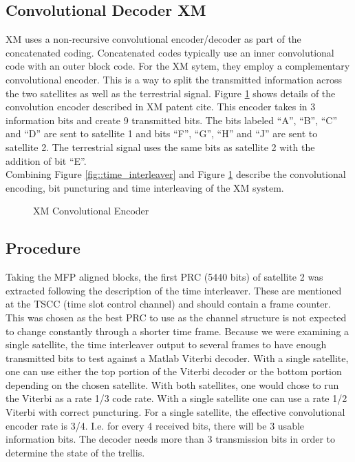 \documentclass[conference,onecolumn]{IEEEtran}
\begin{document}
\subsection{Convolutional Decoder XM}
XM uses a non-recursive convolutional encoder/decoder as part of the concatenated coding.  Concatenated codes typically use an inner convolutional code with an outer block code.  For the XM sytem, they employ a complementary convolutional encoder.  This is a way to split the transmitted information across the two satellites as well as the terrestrial signal.  Figure \ref{fig::Viterbi} shows details of the convolution encoder described in XM patent {cite}.  This encoder takes in 3 information bits and create 9 transmitted bits.  The bits labeled ``A'', ``B'', ``C'' and ``D'' are sent to satellite 1 and bits ``F'', ``G'', ``H'' and ``J'' are sent to satellite 2.  The terrestrial signal uses the same bits as satellite 2 with the addition of bit ``E''.\\

Combining Figure \ref{fig::time_interleaver} and Figure \ref{fig::Viterbi} describe the convolutional encoding, bit puncturing and time interleaving of the XM system.
\begin{figure}[H]
	\centerline{}
	\caption{XM Convolutional Encoder}
	\label{fig::Viterbi}
\end{figure}
\subsection{Procedure}  Taking the MFP aligned blocks, the first PRC (5440 bits) of satellite 2 was extracted following the description of the time interleaver.  These are mentioned at the TSCC (time slot control channel) and should contain a frame counter.  This was chosen as the best PRC to use as the channel structure is not expected to change constantly through a shorter time frame.  Because we were examining a single satellite, the time interleaver output to several frames to have enough transmitted bits to test against a Matlab Viterbi decoder.  With a single satellite, one can use either the top portion of the Viterbi decoder or the bottom portion depending on the chosen satellite.  With both satellites, one would chose to run the Viterbi as a rate 1/3 code rate.  With a single satellite one can use a rate 1/2 Viterbi with correct puncturing.  For a single satellite, the effective convolutional encoder rate is 3/4.  I.e. for every 4 received bits, there will be 3 usable information bits.  The decoder needs more than 3 transmission bits in order to determine the state of the trellis.
\end{document}
